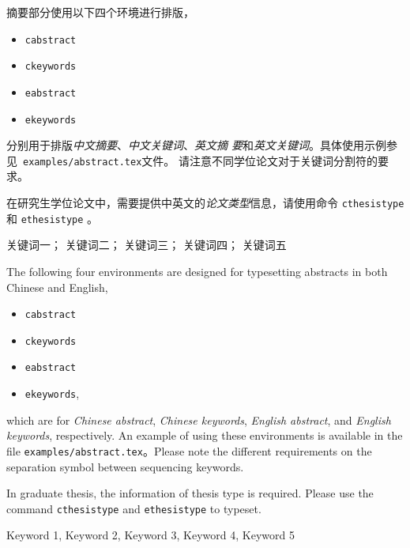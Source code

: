 
\begin{cabstract}
  摘要部分使用以下四个环境进行排版，
  \begin{itemize}
  \item \texttt{cabstract}
  \item \texttt{ckeywords}
  \item \texttt{eabstract}
  \item \texttt{ekeywords}
  \end{itemize}
  分别用于排版\textit{中文摘要}、\textit{中文关键词}、\textit{英文摘
    要}和\textit{英文关键词}。具体使用示例参见~\texttt{examples/abstract.tex}文件。
  请注意不同学位论文对于关键词分割符的要求。

  在研究生学位论文中，需要提供中英文的\textit{论文类型}信息，请使用命令
  \texttt{cthesistype} 和 \texttt{ethesistype} 。
\end{cabstract}

\begin{ckeywords}
  关键词一； 关键词二； 关键词三； 关键词四； 关键词五
\end{ckeywords}



\begin{eabstract}
  The following four environments are designed for typesetting abstracts in both
  Chinese and English,
  \begin{itemize}
  \item \texttt{cabstract}
  \item \texttt{ckeywords}
  \item \texttt{eabstract}
  \item \texttt{ekeywords},
  \end{itemize}
  which are for \textit{Chinese abstract}, \textit{Chinese keywords},
  \textit{English abstract}, and \textit{English keywords}, respectively. An
  example of using these environments is available in the file
  \texttt{examples/abstract.tex}。Please note the different requirements on the
  separation symbol between sequencing keywords.

  In graduate thesis, the information of thesis type is required. Please use the
  command \texttt{cthesistype} and \texttt{ethesistype} to typeset.
\end{eabstract}

\begin{ekeywords}
  Keyword 1, Keyword 2, Keyword 3, Keyword 4, Keyword 5
\end{ekeywords}


